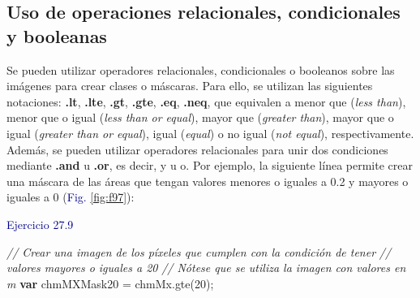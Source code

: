\documentclass[
  12pt,
  letterpaper,
  twoside]{book}
\newenvironment{Shaded}{\begin{snugshade}}{\end{snugshade}}
\newcommand{\CommentTok}[1]{\textcolor[rgb]{0.24,0.58,0.00}{\textit{#1}}}
\newcommand{\DecValTok}[1]{\textcolor[rgb]{0.28,0.53,0.93}{#1}}
\newcommand{\FunctionTok}[1]{\textcolor[rgb]{0.48,0.12,0.64}{#1}}
\newcommand{\KeywordTok}[1]{\textcolor[rgb]{0.00,0.00,0.00}{\textbf{#1}}}
\newcommand{\NormalTok}[1]{#1}
\newcommand{\OperatorTok}[1]{\textcolor[rgb]{0.00,0.00,0.00}{#1}}
\newcommand\boldpurple[1]{\textcolor{darkpurple}{\textbf{#1}}}
\begin{document}
\hypertarget{uso-de-operaciones-relacionales-condicionales-y-booleanas}{%
\subsection*{Uso de operaciones relacionales, condicionales y booleanas}\label{uso-de-operaciones-relacionales-condicionales-y-booleanas}}

Se pueden utilizar operadores relacionales, condicionales o booleanos sobre las imágenes para crear clases o máscaras. Para ello, se utilizan las siguientes notaciones: \boldpurple{.lt}, \boldpurple{.lte}, \boldpurple{.gt}, \boldpurple{.gte}, \boldpurple{.eq}, \boldpurple{.neq}, que equivalen a menor que (\emph{less than}), menor que o igual (\emph{less than or equal}), mayor que (\emph{greater than}), mayor que o igual (\emph{greater than or equal}), igual (\emph{equal}) o no igual (\emph{not equal}), respectivamente. Además, se pueden utilizar operadores relacionales para unir dos condiciones mediante \boldpurple{.and} u \boldpurple{.or}, es decir, y u o. Por ejemplo, la siguiente línea permite crear una máscara de las áreas que tengan valores menores o iguales a 0.2 y mayores o iguales a 0 (\textcolor{darkblue}{Fig.} \ref{fig:f97}):

\textcolor{darkblue}{Ejercicio 27.9}

\begin{Shaded}
\begin{Highlighting}[]
\CommentTok{// Crear una imagen de los píxeles que cumplen con la condición de tener }
\CommentTok{// valores mayores o iguales a 20}
\CommentTok{// Nótese que se utiliza la imagen con valores en m}
\KeywordTok{var}\NormalTok{ chmMXMask20 }\OperatorTok{=}\NormalTok{ chmMx}\OperatorTok{.}\FunctionTok{gte}\NormalTok{(}\DecValTok{20}\NormalTok{)}\OperatorTok{;}
\end{Highlighting}
\end{Shaded}
\end{document}
